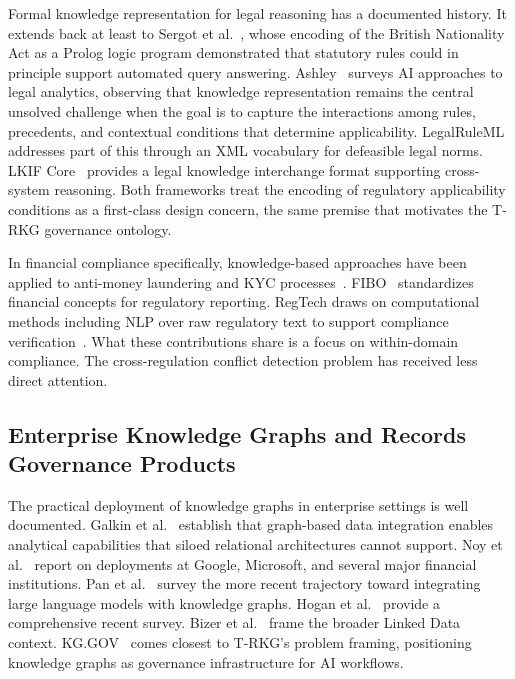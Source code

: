 \documentclass{ieeeaccess}
\begin{document}
Formal knowledge representation for legal reasoning has a documented history. It extends back at least to Sergot et al.~\cite{sergot1986}, whose encoding of the British Nationality Act as a Prolog logic program demonstrated that statutory rules could in principle support automated query answering. Ashley~\cite{ashley2017} surveys AI approaches to legal analytics, observing that knowledge representation remains the central unsolved challenge when the goal is to capture the interactions among rules, precedents, and contextual conditions that determine applicability. LegalRuleML~\cite{legalruleml} addresses part of this through an XML vocabulary for defeasible legal norms. LKIF Core~\cite{lkif} provides a legal knowledge interchange format supporting cross-system reasoning. Both frameworks treat the encoding of regulatory applicability conditions as a first-class design concern, the same premise that motivates the T-RKG governance ontology.

In financial compliance specifically, knowledge-based approaches have been applied to anti-money laundering and KYC processes~\cite{weber2019}. FIBO~\cite{fibo} standardizes financial concepts for regulatory reporting. RegTech draws on computational methods including NLP over raw regulatory text to support compliance verification~\cite{arner2017,legalbert}. What these contributions share is a focus on within-domain compliance. The cross-regulation conflict detection problem has received less direct attention.

\subsection{Enterprise Knowledge Graphs and Records Governance Products}

The practical deployment of knowledge graphs in enterprise settings is well documented. Galkin et al.~\cite{galkin2017} establish that graph-based data integration enables analytical capabilities that siloed relational architectures cannot support. Noy et al.~\cite{noy2019} report on deployments at Google, Microsoft, and several major financial institutions. Pan et al.~\cite{pan2024} survey the more recent trajectory toward integrating large language models with knowledge graphs. Hogan et al.~\cite{hogan2021} provide a comprehensive recent survey. Bizer et al.~\cite{bizer2009} frame the broader Linked Data context. KG.GOV~\cite{kggov2025} comes closest to T-RKG's problem framing, positioning knowledge graphs as governance infrastructure for AI workflows.
\end{document}
